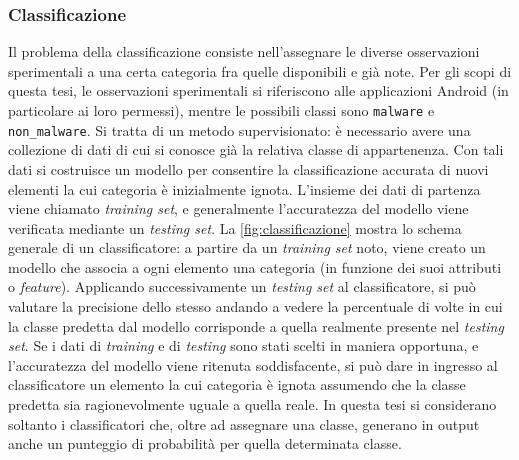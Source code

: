 \documentclass[12pt,a4paper,oneside]{article}
\begin{document}
\subsubsection{Classificazione}

Il problema della classificazione \cite{STATISTICAL_INTRO} consiste nell'assegnare le diverse osservazioni sperimentali a una certa categoria fra quelle disponibili e già note. Per gli scopi di questa tesi, le osservazioni sperimentali si riferiscono alle applicazioni Android (in particolare ai loro permessi), mentre le possibili classi sono \texttt{malware} e \texttt{non\_malware}. Si tratta di un metodo supervisionato: è necessario avere una collezione di dati di cui si conosce già la relativa classe di appartenenza. Con tali dati si costruisce un modello per consentire la classificazione accurata di nuovi elementi la cui categoria è inizialmente ignota. L'insieme dei dati di partenza viene chiamato \textit{training set}, e generalmente l'accuratezza del modello viene verificata mediante un \textit{testing set}. La \cref{fig:classificazione} mostra lo schema generale di un classificatore: a partire da un \textit{training set} noto, viene creato un modello che associa a ogni elemento una categoria (in funzione dei suoi attributi o \textit{feature}). Applicando successivamente un \textit{testing set} al classificatore, si può valutare la precisione dello stesso andando a vedere la percentuale di volte in cui la classe predetta dal modello corrisponde a quella realmente presente nel \textit{testing set}. Se i dati di \textit{training} e di \textit{testing} sono stati scelti in maniera opportuna, e l'accuratezza del modello viene ritenuta soddisfacente, si può dare in ingresso al classificatore un elemento la cui categoria è ignota assumendo che la classe predetta sia ragionevolmente uguale a quella reale. In questa tesi si considerano soltanto i classificatori che, oltre ad assegnare una classe, generano in output anche un punteggio di probabilità per quella determinata classe.
\end{document}
